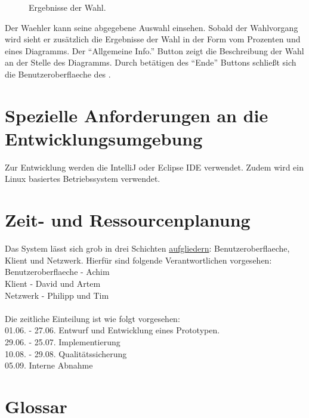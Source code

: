 \documentclass[parskip=full,11pt,twoside]{scrartcl}
\begin{document}
\begin{figure}[H]
	\caption{\label{fig:whlr-result}
		Ergebnisse der \gls{Wahl}.
	}
\end{figure}
Der \gls{Waehler} kann seine abgegebene Auswahl einsehen.
Sobald der Wahlvorgang  wird sieht er zusätzlich die Ergebnisse der \gls{Wahl} in der Form vom Prozenten und eines Diagramms.
Der \enquote{Allgemeine Info.} Button zeigt die Beschreibung der \gls{Wahl} an der Stelle des Diagramms.
Durch betätigen des \enquote{Ende} Buttons schließt sich die \gls{Benutzeroberflaeche} des .

\section{Spezielle Anforderungen an die Entwicklungsumgebung}
Zur Entwicklung werden die IntelliJ oder Eclipse IDE verwendet.
Zudem wird ein \gls{Linux} basiertes Betriebssystem verwendet.

\section{Zeit- und Ressourcenplanung}
Das System lässt sich grob in drei Schichten \hyperref[fig:sysArch]{aufgliedern}: \gls{Benutzeroberflaeche}, \gls{Klient} und \gls{Netzwerk}. Hierfür sind folgende Verantwortlichen vorgesehen:\\
\gls{Benutzeroberflaeche} - Achim\\
\gls{Klient} - David und Artem\\
\gls{Netzwerk} - Philipp und Tim\\
\\
Die zeitliche Einteilung ist wie folgt vorgesehen:\\
01.06. - 27.06. Entwurf und Entwicklung eines Prototypen.\\
29.06. - 25.07. Implementierung\\
10.08. - 29.08. Qualitätssicherung\\
05.09. Interne Abnahme

\section{Glossar}
\printglossaries
\end{document}
